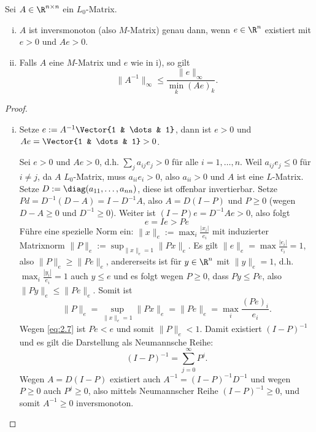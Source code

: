 \begin{st}[$M$-Kriterium] \label{2.28}
	Sei $A \in \R^{n\times n}$ ein $L_0$-Matrix.
	\begin{enumerate}[i)]
		\item
			$A$ ist inversmonoton (also $M$-Matrix) genau dann, wenn $e \in \R^n$ existiert mit $e > 0$ und $Ae > 0$.
		\item
			Falls $A$ eine $M$-Matrix und $e$ wie in i), so gilt
			\[
				\|A^{-1}\|_{\infty} \le \frac{\|e\|_\infty}{\min_{k}(Ae)_k}.
			\]
	\end{enumerate}
	\begin{proof}
		\begin{enumerate}[i)]
			\item
				\begin{segnb}{\ProofImplication}
					Setze $e := A^{-1} \Vector{1 & \dots & 1}$, dann ist $e > 0$ und $Ae = \Vector{1 & \dots & 1} > 0$.
				\end{segnb}
				\begin{seg}{\ProofImplication*}
					Sei $e > 0$ und $Ae > 0$, d.h. $\sum_{j} a_{ij} e_j > 0$ für alle $i = 1, \dotsc, n$.
					Weil $a_{ij} e_j \le 0$ für $i \neq j$, da $A$ $L_0$-Matrix, muss $a_{ii} e_i > 0$, also $a_{ii} > 0$ und $A$ ist eine $L$-Matrix.
					Setze $D := \diag(a_{11}, \dotsc, a_{nn})$, diese ist offenbar invertierbar.
					Setze $P d= D^{-1}(D-A) = I - D^{-1} A$, also $A = D(I-P)$ und $P \ge 0$ (wegen $D - A \ge 0$ und $D^{-1} \ge 0$).
					Weiter ist $(I-P)e = D^{-1}A e > 0$, also folgt
					\begin{equation} \label{eq:2.7}
						e = Ie > Pe
					\end{equation}
					Führe eine spezielle Norm ein: $\|x\|_e := \max_i \frac{|x_i|}{e_i}$ mit induzierter Matrixnorm $\|P\|_e := \sup_{\|x\|_e = 1} \|Px\|_e$.
					Es gilt $\|e\|_e = \max \frac{|e_i|}{e_i} = 1$, also $\|P\|_e \ge \|Pe\|_e$, andererseits ist für $y \in \R^n$ mit $\|y\|_e = 1$, d.h. $\max_i \frac{|y_i|}{e_i} = 1$ auch $y \le e$ und es folgt wegen $P \ge 0$, dass $Py \le Pe$, also $\|Py\|_e \le \|Pe\|_e$.
					Somit ist
					\[
						\|P\|_e = \sup_{\|x\|_e = 1} \|Px\|_e = \|Pe\|_e = \max_i \frac{(Pe)_i}{e_i}.
					\]
					Wegen \eqref{eq:2.7} ist $Pe < e$ und somit $\|P\|_e < 1$.
					Damit existiert $(I - P)^{-1}$ und es gilt die Darstellung als Neumannsche Reihe:
					\[
						(I - P)^{-1} = \sum_{j=0}^\infty P^j.
					\]
					Wegen $A = D(I-P)$ existiert auch $A^{-1} = (I-P)^{-1}D^{-1}$ und wegen $P \ge 0$ auch $P^j \ge 0$, also mittels Neumannscher Reihe $(I-P)^{-1} \ge 0$, und somit $A^{-1} \ge 0$ inversmonoton.

\end{seg}
\end{enumerate}
\end{proof}
\end{st}
